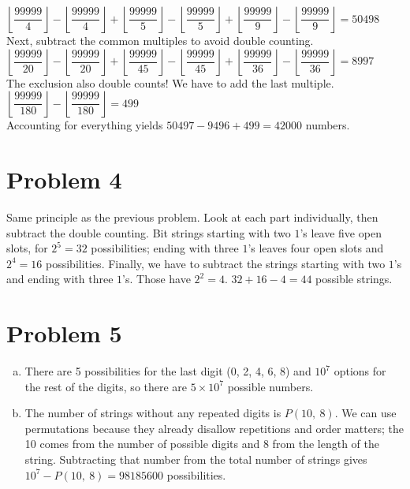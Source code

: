 \documentclass[11pt]{article}
\begin{document}
	$\left\lfloor{	\dfrac{ 99999 }{4} } \right\rfloor - \left\lfloor{	\dfrac{ 99999 }{4} } \right\rfloor +
	\left\lfloor{	\dfrac{ 99999 }{5} } \right\rfloor - \left\lfloor{	\dfrac{ 99999 }{5} } \right\rfloor +
	\left\lfloor{	\dfrac{ 99999 }{9} } \right\rfloor - \left\lfloor{	\dfrac{ 99999 }{9} } \right\rfloor = 50498$\\

	Next, subtract the common multiples to avoid double counting. \\

	$\left\lfloor{	\dfrac{ 99999 }{20} } \right\rfloor - \left\lfloor{	\dfrac{ 99999 }{20} } \right\rfloor +
	\left\lfloor{	\dfrac{ 99999 }{45} } \right\rfloor - \left\lfloor{	\dfrac{ 99999 }{45} } \right\rfloor +
	\left\lfloor{	\dfrac{ 99999 }{36} } \right\rfloor - \left\lfloor{	\dfrac{ 99999 }{36} } \right\rfloor = 8997$\\
	
	
	The exclusion also double counts! We have to add the last multiple.\\
	
	$ \left\lfloor{	\dfrac{ 99999 }{180} } \right\rfloor - \left\lfloor{	\dfrac{ 99999 }{180} } \right\rfloor = 499$\\
	
	Accounting for everything yields $50497-9496+499 = 42000$ numbers. 

\section*{Problem 4}
	Same principle as the previous problem. Look at each part individually, then subtract the double counting. Bit strings starting with two $1$'s leave five open slots, for $2^5 = 32$ possibilities; ending with three $1$'s leaves four open slots and $2^4 = 16$ possibilities. Finally, we have to subtract the strings starting with two $1$'s and ending with three $1$'s. Those have $2^2 = 4$. $32+16-4 = 44$ possible strings.


\section*{Problem 5}
\begin{enumerate}[(a)]
	\item
	There are 5 possibilities for the last digit (0, 2, 4, 6, 8) and $10^7$ options for the rest of the digits, so there are $5\times 10^7$ 
	possible numbers.
	
	\item
	The number of strings without any repeated digits is $P( 10,\ 8 )$. We can use permutations because they already disallow repetitions and order 
	matters; the 10 comes from the number of possible digits and 8 from the length of the string. Subtracting that number from the total number of 
	strings gives $10^7 - P(10,\ 8) = 98185600$ possibilities.

\end{enumerate}
\end{document}
